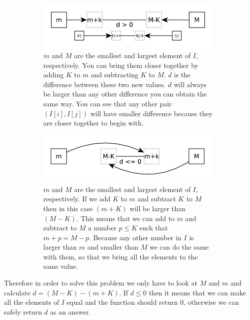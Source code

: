 \begin{figure}
	\vspace*{-0.5in}
	\centering
	\begin{subfigure}[t]{0.90\textwidth}
		\includegraphics[width=\textwidth]{sources/smallest_range/images/explanation1} 
		\caption{$m$ and $M$ are the smallest and largest element of $I$, respectively. You can
		bring them closer together by adding $K$ to $m$ and subtracting $K$ to $M$. $d$ is the
		difference between these two new values. $d$ will always be larger than any other difference
		you can obtain the same way. You can see that any other pair $(I[i], I[j])$ will have
		smaller difference because they are closer together to begin with.}
		\label{fig:smallest_range:explanation1} 
	 \end{subfigure}
	\medskip
	\begin{subfigure}[t]{0.90\textwidth}
		\includegraphics[width=\textwidth]{sources/smallest_range/images/explanation2} 
		\caption{$m$ and $M$ are the smallest and largest element of $I$, respectively. If we  add
		$K$ to $m$ and subtract $K$ to $M$ then in this case $(m+K)$ will be larger than $(M-K)$.
		This means that we can add to $m$ and subtract to $M$ a number $p \leq K$ such that $m+p =
		M-p$. Because any other number in $I$ is larger than $m$ and smaller than $M$ we can do the
		same with them, so that we bring all the elements to the same value.}
		\label{fig:smallest_range:explanation2} 
	 \end{subfigure}
	 \medskip
	 \label{}
	 \caption{}
\end{figure}
Therefore in order to solve this problem we only have to look at $M$ and $m$ and calculate
$d=(M-K)-(m+K)$. If $d \leq 0$ then it means that we can make all the elements of $I$ equal and the
function should return $0$, otherwise we can safely return $d$ as an answer.


